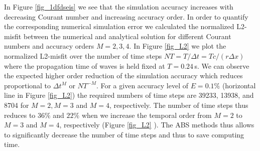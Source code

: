 \documentclass[11pt,onecolumn,oneside]{article}
\begin{document}
In Figure \ref{fig_1dfdseis} we see that the simulation accuracy increases with decreasing Courant number and increasing accuracy order.  In order to quantify the corresponding numerical simulation error we calculated the normalized L2-misfit between the numerical and analytical solution for different Courant numbers and accuracy orders 
$M = 2, 3, 4$. 
In Figure \ref{fig_L2} we plot the normalized L2-misfit over the number of time steps $NT=T/\Delta t=T c/(r \Delta x)$ where the propagation time of waves is held fixed at $T=0.24$\,s. We can observe the expected higher order reduction of the simulation accuracy which reduces proportional to $\Delta t^{M}$ or $NT^{-M}$. For a given accuracy level of $E=0.1\%$ (horizontal line in Figure \ref{fig_L2}) the required numbers of time steps are 39233, 13938, and 8704 for $M=2,M=3$ and $M=4$, respectively. The number of time steps thus reduces  to $36\%$  and $22\%$  when we increase the temporal order from $M=2$ to  $M=3$ and $M=4$, respectively (Figure  \ref{fig_L2} ). The ABS methods thus allows to significantly decrease the number of time steps and thus to save computing time. \\ \\
\end{document}
